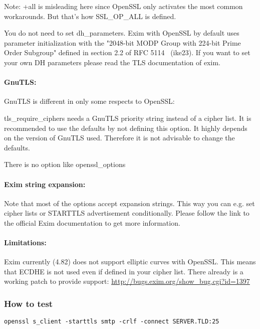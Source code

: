 Note: +all is misleading here since OpenSSL only activates the most common workarounds. But that's how SSL\_OP\_ALL is defined.

You do not need to set dh\_parameters. Exim with OpenSSL by default uses parameter initialization with the "2048-bit MODP Group with 224-bit Prime Order Subgroup" defined in section 2.2 of RFC 5114~\cite{rfc5114} (ike23).
If you want to set your own DH parameters please read the TLS documentation of exim.


\paragraph{GnuTLS:}
GnuTLS is different in only some respects to OpenSSL:
\begin{itemize*}
  \item tls\_require\_ciphers needs a GnuTLS priority string instead of a cipher list. It is recommended to use the defaults by not defining this option. It highly depends on the version of GnuTLS used. Therefore it is not advisable to change the defaults.
  \item There is no option like openssl\_options
\end{itemize*}

\paragraph{Exim string expansion:}
Note that most of the options accept expansion strings. This way you can e.g. set cipher lists or STARTTLS advertisement conditionally. Please follow the link to the official Exim documentation to get more information.

\paragraph{Limitations:}
Exim currently (4.82) does not support elliptic curves with OpenSSL. This means that ECDHE is not used even if defined in your cipher list.
There already is a working patch to provide support:
\url{http://bugs.exim.org/show_bug.cgi?id=1397}

\subsubsection{How to test}
\begin{lstlisting}
openssl s_client -starttls smtp -crlf -connect SERVER.TLD:25
\end{lstlisting}



